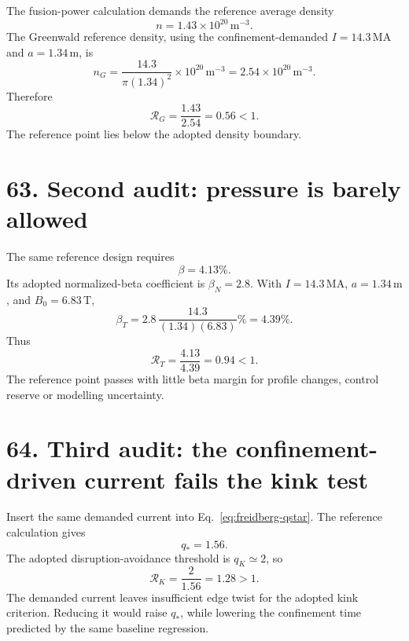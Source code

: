 \documentclass[11pt]{article}
\begin{document}
The fusion-power calculation demands the reference average density
\[
 n=1.43\times10^{20}\,\mathrm{m^{-3}}.
\]
The Greenwald reference density, using the confinement-demanded
$I=14.3\,\mathrm{MA}$ and $a=1.34\,\mathrm m$, is
\[
 n_G=
\frac{14.3}{\pi(1.34)^2}\times10^{20}\,\mathrm{m^{-3}}
=2.54\times10^{20}\,\mathrm{m^{-3}}.
\]
Therefore
\begin{equation}
 \mathcal R_G=\frac{1.43}{2.54}=0.56<1.
\label{eq:greenwald-reference}
\end{equation}
The reference point lies below the adopted density boundary.


\section*{63. Second audit: pressure is barely allowed}

The same reference design requires
\[
 \beta=4.13\%.
\]
Its adopted normalized-beta coefficient is $\beta_N=2.8$. With
$I=14.3\,\mathrm{MA}$, $a=1.34\,\mathrm m$, and $B_0=6.83\,\mathrm T$,
\[
 \beta_T=
 2.8\,\frac{14.3}{(1.34)(6.83)}\%=4.39\%.
\]
Thus
\begin{equation}
 \mathcal R_T=\frac{4.13}{4.39}=0.94<1.
\label{eq:troyon-reference}
\end{equation}
The reference point passes with little beta margin for profile changes, control
reserve or modelling uncertainty.


\section*{64. Third audit: the confinement-driven current fails the kink test}

Insert the same demanded current into Eq.~\eqref{eq:freidberg-qstar}. The reference
calculation gives
\[
 q_*=1.56.
\]
The adopted disruption-avoidance threshold is $q_K\simeq2$, so
\begin{equation}
 \mathcal R_K=\frac{2}{1.56}=1.28>1.
\label{eq:kink-reference}
\end{equation}
The demanded current leaves insufficient edge twist for the adopted kink criterion.
Reducing it would raise $q_*$, while lowering the confinement time predicted by the
same baseline regression.
\end{document}
